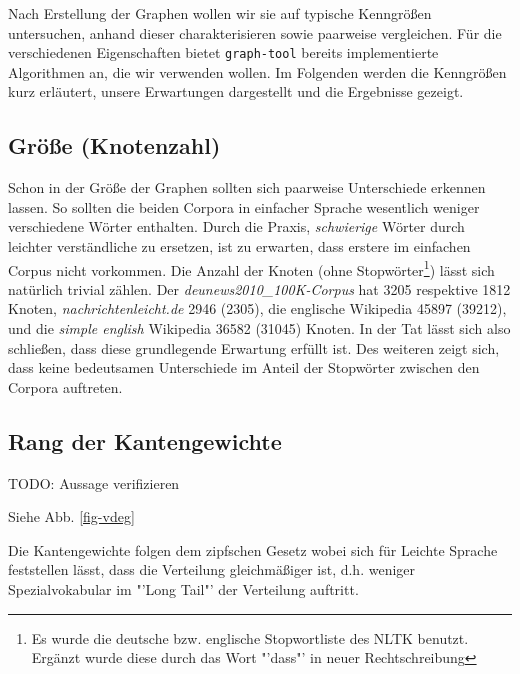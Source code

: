 \documentclass[11pt, a4paper]{article}
\begin{document}
Nach Erstellung der Graphen wollen wir sie auf typische Kenngrößen untersuchen,
anhand dieser charakterisieren sowie paarweise vergleichen. Für die
verschiedenen Eigenschaften bietet \texttt{graph-tool} bereits implementierte
Algorithmen an, die wir verwenden wollen. Im Folgenden werden die Kenngrößen
kurz erläutert, unsere Erwartungen dargestellt und die Ergebnisse gezeigt.

\subsection{Gr\"o\ss{}e (Knotenzahl)}

Schon in der Größe der Graphen sollten sich paarweise Unterschiede erkennen
lassen. So sollten die beiden Corpora in einfacher Sprache wesentlich weniger
verschiedene Wörter enthalten. Durch die Praxis, \emph{schwierige} Wörter
durch leichter verständliche zu ersetzen, ist zu erwarten, dass erstere im einfachen
Corpus nicht vorkommen. Die Anzahl der Knoten (ohne Stopw\"orter\footnote{Es wurde
die deutsche bzw. englische Stopwortliste des NLTK benutzt. Erg\"anzt wurde
diese durch das Wort "'dass"' in neuer Rechtschreibung}) lässt sich natürlich
trivial zählen. Der \emph{deunews2010\_100K-Corpus} hat 3205 respektive 1812
Knoten, \emph{nachrichtenleicht.de} 2946 (2305), die englische Wikipedia 45897
(39212), und die \emph{simple english} Wikipedia 36582 (31045) Knoten. In der
Tat l\"asst sich also schlie\ss{}en, dass diese grundlegende Erwartung
erf\"ullt ist. Des weiteren zeigt sich, dass keine bedeutsamen Unterschiede im
Anteil der Stopw\"orter zwischen den Corpora auftreten.

\subsection{Rang der Kantengewichte}

TODO: Aussage verifizieren

Siehe Abb. \ref{fig-vdeg}

Die Kantengewichte folgen dem zipfschen Gesetz wobei sich f\"ur Leichte Sprache
feststellen l\"asst, dass die Verteilung gleichm\"a\ss{}iger ist, d.h. weniger
Spezialvokabular im "'Long Tail"' der Verteilung auftritt.
\end{document}
